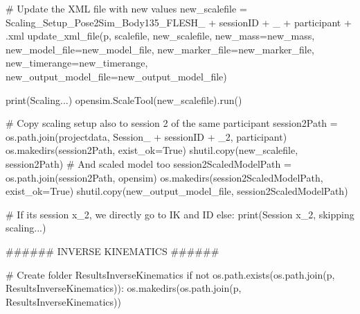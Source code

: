 \documentclass[
  letterpaper,
  DIV=11,
  numbers=noendperiod]{scrreprt}
\newenvironment{Shaded}{\begin{snugshade}}{\end{snugshade}}
\newcommand{\BuiltInTok}[1]{\textcolor[rgb]{0.00,0.23,0.31}{#1}}
\newcommand{\CommentTok}[1]{\textcolor[rgb]{0.37,0.37,0.37}{#1}}
\newcommand{\ControlFlowTok}[1]{\textcolor[rgb]{0.00,0.23,0.31}{#1}}
\newcommand{\KeywordTok}[1]{\textcolor[rgb]{0.00,0.23,0.31}{#1}}
\newcommand{\NormalTok}[1]{\textcolor[rgb]{0.00,0.23,0.31}{#1}}
\newcommand{\OperatorTok}[1]{\textcolor[rgb]{0.37,0.37,0.37}{#1}}
\newcommand{\StringTok}[1]{\textcolor[rgb]{0.13,0.47,0.30}{#1}}
\newcommand{\VariableTok}[1]{\textcolor[rgb]{0.07,0.07,0.07}{#1}}
\begin{document}
\begin{Shaded}
\begin{Highlighting}[]
            \CommentTok{\# Update the XML file with new values}
\NormalTok{            new\_scalefile }\OperatorTok{=} \StringTok{\textquotesingle{}Scaling\_Setup\_Pose2Sim\_Body135\_FLESH\_\textquotesingle{}} \OperatorTok{+}\NormalTok{ sessionID }\OperatorTok{+} \StringTok{\textquotesingle{}\_\textquotesingle{}} \OperatorTok{+}\NormalTok{ participant }\OperatorTok{+} \StringTok{\textquotesingle{}.xml\textquotesingle{}}
\NormalTok{            update\_xml\_file(p, scalefile, new\_scalefile, new\_mass}\OperatorTok{=}\NormalTok{new\_mass, new\_model\_file}\OperatorTok{=}\NormalTok{new\_model\_file, new\_marker\_file}\OperatorTok{=}\NormalTok{new\_marker\_file, new\_timerange}\OperatorTok{=}\NormalTok{new\_timerange, new\_output\_model\_file}\OperatorTok{=}\NormalTok{new\_output\_model\_file)}

            \BuiltInTok{print}\NormalTok{(}\StringTok{\textquotesingle{}Scaling...\textquotesingle{}}\NormalTok{)}
\NormalTok{            opensim.ScaleTool(new\_scalefile).run()}
            
            \CommentTok{\# Copy scaling setup also to session 2 of the same participant}
\NormalTok{            session2Path }\OperatorTok{=}\NormalTok{ os.path.join(projectdata, }\StringTok{\textquotesingle{}Session\_\textquotesingle{}} \OperatorTok{+}\NormalTok{ sessionID }\OperatorTok{+} \StringTok{\textquotesingle{}\_2\textquotesingle{}}\NormalTok{, participant)}
\NormalTok{            os.makedirs(session2Path, exist\_ok}\OperatorTok{=}\VariableTok{True}\NormalTok{)}
\NormalTok{            shutil.copy(new\_scalefile, session2Path)}
            \CommentTok{\# And scaled model too}
\NormalTok{            session2ScaledModelPath }\OperatorTok{=}\NormalTok{ os.path.join(session2Path, }\StringTok{\textquotesingle{}opensim\textquotesingle{}}\NormalTok{)}
\NormalTok{            os.makedirs(session2ScaledModelPath, exist\_ok}\OperatorTok{=}\VariableTok{True}\NormalTok{)}
\NormalTok{            shutil.copy(new\_output\_model\_file, session2ScaledModelPath)}

        \CommentTok{\# If its session x\_2, we directly go to IK and ID}
        \ControlFlowTok{else}\NormalTok{:}
            \BuiltInTok{print}\NormalTok{(}\StringTok{\textquotesingle{}Session x\_2, skipping scaling...\textquotesingle{}}\NormalTok{)}

        \CommentTok{\#\#\#\#\#\# INVERSE KINEMATICS \#\#\#\#\#\#}

        \CommentTok{\# Create folder ResultsInverseKinematics}
        \ControlFlowTok{if} \KeywordTok{not}\NormalTok{ os.path.exists(os.path.join(p, }\StringTok{\textquotesingle{}ResultsInverseKinematics\textquotesingle{}}\NormalTok{)):}
\NormalTok{            os.makedirs(os.path.join(p, }\StringTok{\textquotesingle{}ResultsInverseKinematics\textquotesingle{}}\NormalTok{))}
            

\end{Highlighting}
\end{Shaded}
\end{document}
